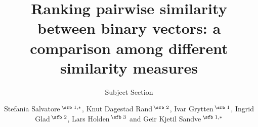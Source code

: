 \documentclass{bioinfo}
\begin{document}

\subtitle{Subject Section}

\title[short Title]{Ranking pairwise similarity between binary vectors: a comparison among different similarity measures}
\author[Sample \textit{et~al}.]{Stefania Salvatore\,$^{\text{\sfb 1,}*}$, Knut Dagestad Rand\,$^{\text{\sfb 2}}$, Ivar Grytten\,$^{\text{\sfb 1}}$, Ingrid Glad\,$^{\text{\sfb 2}}$, Lars Holden\,$^{\text{\sfb 3}}$ and Geir Kjetil Sandve\,$^{\text{\sfb 1,}*}$}
\address{$^{\text{\sf 1}}$Department of Informatics, University of Oslo, Oslo, Norway. \\
$^{\text{\sf 2}}$Department of Mathematics, University of Oslo, Oslo, Norway. \\
$^{\text{\sf 3}}$Statistics For Innovation, Norwegian Computing Center, Oslo, Norway.}



\end{document}
